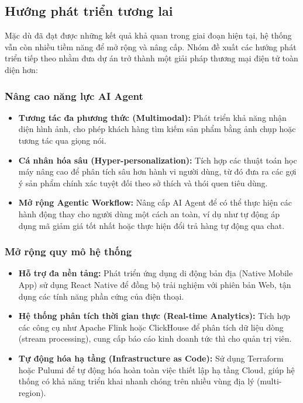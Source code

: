 \subsection{Hướng phát triển tương lai}

Mặc dù đã đạt được những kết quả khả quan trong giai đoạn hiện tại, hệ thống vẫn còn nhiều tiềm năng để mở rộng và nâng cấp. Nhóm đề xuất các hướng phát triển tiếp theo nhằm đưa dự án trở thành một giải pháp thương mại điện tử toàn diện hơn:

\subsubsection{Nâng cao năng lực AI Agent}
\begin{itemize}
    \item \textbf{Tương tác đa phương thức (Multimodal):} Phát triển khả năng nhận diện hình ảnh, cho phép khách hàng tìm kiếm sản phẩm bằng ảnh chụp hoặc tương tác qua giọng nói.
    \item \textbf{Cá nhân hóa sâu (Hyper-personalization):} Tích hợp các thuật toán học máy nâng cao để phân tích sâu hơn hành vi người dùng, từ đó đưa ra các gợi ý sản phẩm chính xác tuyệt đối theo sở thích và thói quen tiêu dùng.
    \item \textbf{Mở rộng Agentic Workflow:} Nâng cấp AI Agent để có thể thực hiện các hành động thay cho người dùng một cách an toàn, ví dụ như tự động áp dụng mã giảm giá tốt nhất hoặc thực hiện đổi trả hàng tự động qua chat.
\end{itemize}

\subsubsection{Mở rộng quy mô hệ thống}
\begin{itemize}
    \item \textbf{Hỗ trợ đa nền tảng:} Phát triển ứng dụng di động bản địa (Native Mobile App) sử dụng React Native để đồng bộ trải nghiệm với phiên bản Web, tận dụng các tính năng phần cứng của điện thoại.
    \item \textbf{Hệ thống phân tích thời gian thực (Real-time Analytics):} Tích hợp các công cụ như Apache Flink hoặc ClickHouse để phân tích dữ liệu dòng (stream processing), cung cấp báo cáo kinh doanh tức thì cho quản trị viên.
    \item \textbf{Tự động hóa hạ tầng (Infrastructure as Code):} Sử dụng Terraform hoặc Pulumi để tự động hóa hoàn toàn việc thiết lập hạ tầng Cloud, giúp hệ thống có khả năng triển khai nhanh chóng trên nhiều vùng địa lý (multi-region).
\end{itemize}

